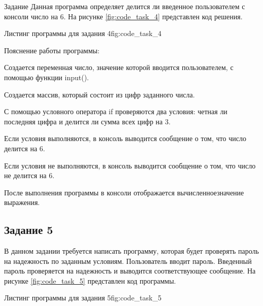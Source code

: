 \documentclass[]{vvsu}
\begin{document}
\begin{addition}{Задание}
Данная программа определяет делится ли введенное пользователем с консоли число на 6.
На рисунке \ref{fig:code_task_4} представлен код решения.

\begin{vvsu_figure}{Листинг программы для задания 4}{fig:code_task_4}
  \begin{minipage}{.75\textwidth}
    
  \end{minipage}
\end{vvsu_figure}

Пояснение работы программы:
\begin{vvsu_list}
  \item Создается переменная число, значение которой вводится пользователем, с помощью функции input().
  \item Создается массив, который состоит из цифр заданного числа.
  \item С помощью условного оператора if проверяются два условия: четная ли последняя цифра и делится ли сумма всех цифр на 3.
  \item Если условия выполняются, в консоль выводится сообщение о том, что число делится на 6.
  \item Если условия не выполняются, в консоль выводится сообщение о том, что число не делится на 6.
\end{vvsu_list}

После выполнения программы в консоли отображается вычисленное\linebreak значение выражения.

\subsection{Задание 5}

В данном задании требуется написать программу, которая будет проверять пароль на надежность по заданным условиям.
Пользователь вводит пароль. Введенный пароль проверяется на надежность и выводится соответствующее сообщение.
На рисунке \ref{fig:code_task_5} представлен код программы.

\begin{vvsu_figure}{Листинг программы для задания 5}{fig:code_task_5}
  \begin{minipage}{.75\textwidth}
    
  \end{minipage}
\end{vvsu_figure}


\end{addition}
\end{document}
